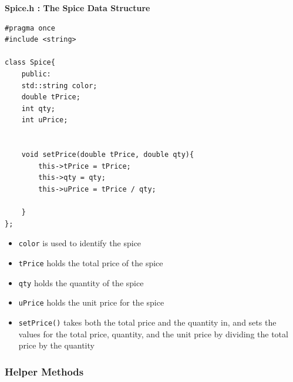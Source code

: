 \documentclass[letterpaper, 10pt]{article}
\begin{document}
\textbf{Spice.h : The Spice Data Structure}
 \begin{addmargin}[-5em]{1em}
\begin{small}
\begin{verbatim}
#pragma once
#include <string>

class Spice{
    public:
    std::string color;
    double tPrice;
    int qty;
    int uPrice;


    void setPrice(double tPrice, double qty){
        this->tPrice = tPrice;
        this->qty = qty;
        this->uPrice = tPrice / qty;
        
    }
};

\end{verbatim}
\end{small}
\end{addmargin}   

\begin{itemize}
    \item \texttt{color} is used to identify the spice
    \item \texttt{tPrice} holds the total price of the spice
    \item \texttt{qty} holds the quantity of the spice
    \item \texttt{uPrice} holds the unit price for the spice
    \item \texttt{setPrice()} takes both the total price and the quantity in, and sets the values for the total price, quantity, and the unit price by dividing the total price by the quantity
\end{itemize}

\subsubsection{Helper Methods}
\end{document}
